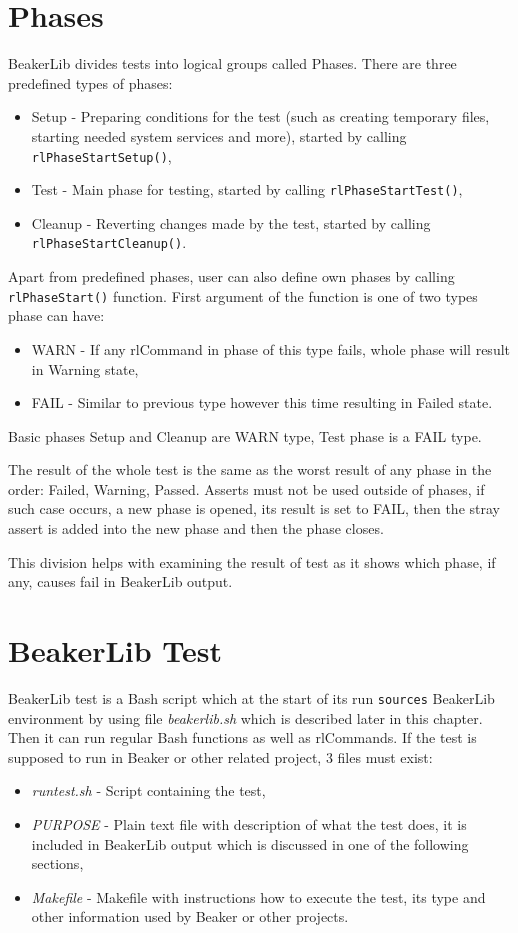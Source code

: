 \section{Phases}
BeakerLib divides tests into logical groups called Phases. There are three predefined types of phases:
\begin{itemize}
\item Setup - Preparing conditions for the test (such as creating temporary files, starting needed system services and more), started by calling \texttt{rlPhaseStartSetup()},
\item Test - Main phase for testing, started by calling \texttt{rlPhaseStartTest()},
\item Cleanup - Reverting changes made by the test, started by calling \\ \texttt{rlPhaseStartCleanup()}.
\end{itemize}

Apart from predefined phases, user can also define own phases by calling \texttt{rlPhaseStart()} function. First argument of the function is one of two types phase can have:

\begin{itemize}
\item WARN - If any rlCommand in phase of this type fails, whole phase will result in Warning state,
\item FAIL - Similar to previous type however this time resulting in Failed state.
\end{itemize}

Basic phases Setup and Cleanup are WARN type, Test phase is a FAIL type.

The result of the whole test is the same as the worst result of any phase in the order: Failed, Warning, Passed.
Asserts must not be used outside of phases, if such case occurs, a new phase is opened, its result is set to FAIL, then the stray assert is added into the new phase and then the phase closes.

This division helps with examining the result of test as it shows which phase, if any, causes fail in BeakerLib output. 


\section{BeakerLib Test}
BeakerLib test is a Bash script which at the start of its run \texttt{sources} BeakerLib environment by using file \textit{beakerlib.sh} which is described later in this chapter. Then it can run regular Bash functions as well as rlCommands. If the test is supposed to run in Beaker or other related project, 3 files must exist:
\begin{itemize}
\item \textit{runtest.sh} - Script containing the test,
\item \textit{PURPOSE} - Plain text file with description of what the test does, it is included in BeakerLib output which is discussed in one of the following sections,
\item \textit{Makefile} - Makefile with instructions how to execute the test, its type and other information used by Beaker or other projects.
\end{itemize}

